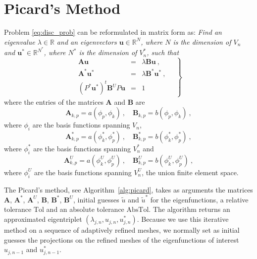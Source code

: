 \documentclass[smallextended]{svjour3}
\begin{document}

\section{Picard's Method}\label{sec:picard}

Problem \eqref{eq:disc_prob} can be reformulated in matrix form as:
\emph{Find an eigenvalue $\lambda\in \mathbb{R}$ and an eigenvectors $\mathbf{u}\in \mathbb{R}^N$, where $N$ is the dimension of $V_n$ and $\mathbf{u}^*\in \mathbb{R}^{N^*}$, where $N^*$ is the dimension of $V_n^*$,
such that}
\begin{equation}
\label{eq:disc_prob_mat}
\left.
\begin{array}{lcl}
\mathbf{A} \mathbf{u}&=& \lambda\mathbf{B}\mathbf{u}\ ,
\\
\mathbf{A}^* \mathbf{u}^*&=& \lambda\mathbf{B}^*\mathbf{u}^*\ ,
\\
(P^*\mathbf{u}^*)^t\mathbf{B}^U P\mathbf{u} &=& 1
\end{array}\quad
\right\}
\end{equation}
where the entries of the matrices $\mathbf{A}$ and $\mathbf{B}$ are 
$$
\mathbf{A}_{k,p}=a(\phi_p,\phi_k)\ ,\quad\mathbf{B}_{k,p}=b(\phi_p,\phi_k)\ ,
$$
where $\phi_i$ are the basis functions spanning $V_n$,
$$
\mathbf{A}^*_{k,p}=a(\phi_k^*,\phi_p^*)\ ,\quad\mathbf{B}^*_{k,p}=b(\phi_k^*,\phi_p^*)\ ,
$$
where $\phi_i^*$ are the basis functions spanning $V_n^*$ and
$$
\mathbf{A}^U_{k,p}=a(\phi_k^U,\phi_p^U)\ ,\quad\mathbf{B}^U_{k,p}=b(\phi_k^U,\phi_p^U)\ ,
$$
where $\phi_i^U$ are the basis functions spanning $V_n^U$, the union finite element space.



The Picard's method, see Algorithm~\ref{alg:picard}, takes as arguments the matrices $\mathbf{A}$, $\mathbf{A}^*$, $\mathbf{A}^U$, $\mathbf{B}$, $\mathbf{B}^*$, $\mathbf{B}^U$, initial guesses $\tilde u$ and $\tilde u^*$ for the eigenfunctions, a relative tolerance $\mathrm{Tol}$ and an absolute tolerance $\mathrm{AbsTol}$. 
The algorithm returns an approximated eigentriplet $(\lambda_{j,n},u_{j,n},u_{j,n}^*)$.
Because we use this iterative method on a sequence of adaptively refined meshes, we normally set as initial guesses
the projections on the refined meshes of the eigenfunctions of interest $u_{j,n-1}$ and $u_{j,n-1}^*$.
\end{document}
